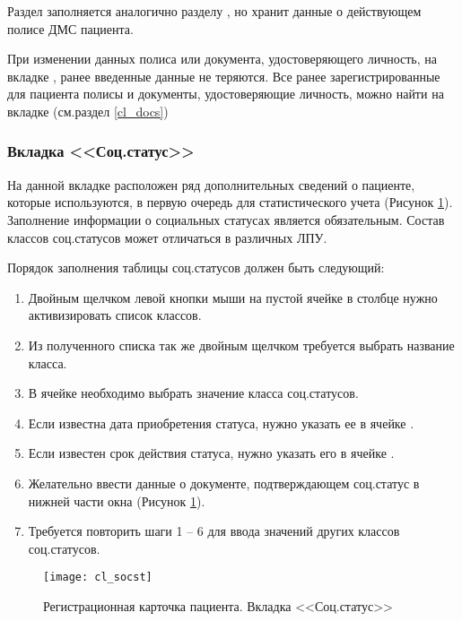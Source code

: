 Раздел  заполняется аналогично разделу , но хранит данные о действующем полисе ДМС пациента.

\begin{prim}
При изменении данных полиса или документа, удостоверяющего личность, на вкладке , ранее введенные данные не теряются. Все ранее зарегистрированные для пациента полисы  и документы, удостоверяющие личность, можно найти на вкладке  (см.раздел \ref{cl_docs})
\end{prim}

\subsubsection{Вкладка <<Соц.статус>>} \label{cl_socst}

На данной вкладке расположен ряд дополнительных сведений о пациенте, которые используются, в первую очередь для статистического учета (Рисунок \ref{img_cl_socst}). Заполнение информации о социальных статусах является обязательным. Состав классов соц.статусов может отличаться в различных ЛПУ.

Порядок заполнения таблицы соц.статусов должен быть следующий:
\begin{enumerate}
 \item Двойным щелчком левой кнопки мыши на пустой ячейке в столбце  нужно активизировать список классов.
 \item Из полученного списка так же двойным щелчком требуется выбрать название класса.
 \item В ячейке  необходимо выбрать значение класса соц.статусов.
 \item Если известна дата приобретения статуса, нужно указать ее в ячейке .
 \item Если известен срок действия статуса, нужно указать его в ячейке .
 \item Желательно ввести данные о документе, подтверждающем соц.статус в нижней части окна (Рисунок \ref{img_cl_socst}).
 \item Требуется повторить шаги 1 – 6 для ввода значений других классов соц.статусов.
\end{enumerate}

\begin{figure}[ht]\centering
 \texttt{[image: cl\_socst]}
 \caption{Регистрационная карточка пациента. Вкладка <<Соц.статус>>}
 \label{img_cl_socst}
\end{figure} 

